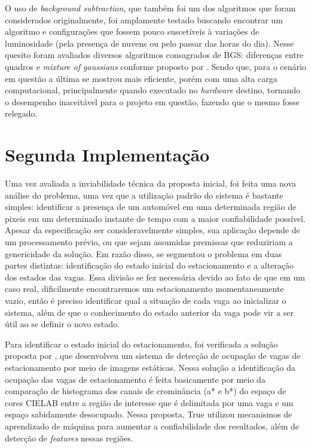 \documentclass[ecp,tc]{iiufrgs}
\begin{document}
O uso de \textit{background subtraction}, que também foi um dos algoritmos que foram considerados originalmente, foi amplamente testado buscando encontrar um algoritmo e configurações que fossem pouco suscetíveis à variações de luminosidade (pela presença de nuvens ou pelo passar das horas do dia). Nesse quesito foram avaliados diversos algoritmos consagrados de BGS: diferenças entre quadros e \textit{mixture of gaussians} conforme proposto por . Sendo que, para o cenário em questão a última se mostrou mais eficiente, porém com uma alta carga computacional, principalmente quando executado no \textit{hardware} destino, tornando o desempenho inaceitável para o projeto em questão, fazendo que o mesmo fosse relegado.


\section{Segunda Implementação}

Uma vez avaliada a inviabilidade técnica da proposta inicial, foi feita uma nova análise do problema, uma vez que a utilização padrão do sistema é bastante simples: identificar a presença de um automóvel em uma determinada região de pixeis em um determinado instante de tempo com a maior confiabilidade possível. Apesar da especificação ser consideravelmente simples, sua aplicação depende de um processamento prévio, ou que sejam assumidas premissas que reduziriam a genericidade da solução. 
Em razão disso, se segmentou o problema em duas partes distintas: identificação do estado inicial do estacionamento e a alteração dos estados das vagas. Essa divisão se fez necessária devido ao fato de que em um caso real, dificilmente encontraremos um estacionamento momentaneamente vazio, então é preciso identificar qual a situação de cada vaga ao inicializar o sistema, além de que o conhecimento do estado anterior da vaga pode vir a ser útil ao se definir o novo estado.

Para identificar o estado inicial do estacionamento, foi verificada a solução proposta por , que desenvolveu um sistema de detecção de ocupação de vagas de estacionamento por meio de imagens estáticas. Nessa solução a identificação da ocupação das vagas de estacionamento é feita basicamente por meio da comparação de histograma dos canais de crominância (a* e b*) do espaço de cores CIELAB entre a região de interesse que é delimitada por uma vaga e um espaço sabidamente desocupado. Nessa proposta, True utilizou mecanismos de aprendizado de máquina para aumentar a confiabilidade dos resultados, além de detecção de \textit{features} nessas regiões.
\end{document}
